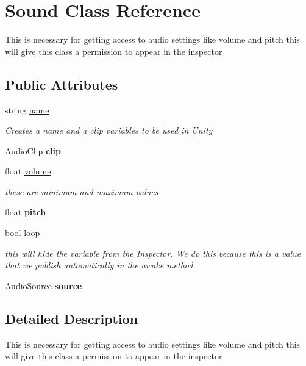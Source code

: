 \hypertarget{class_sound}{}\section{Sound Class Reference}
\label{class_sound}


This is necessary for getting access to audio settings like volume and pitch this will give this class a permission to appear in the inspector  


\subsection*{Public Attributes}
\begin{DoxyCompactItemize}
\item 
string \mbox{\hyperlink{class_sound_a6232daa7d1f983315cc0d10cf776ab76}{name}}
\begin{DoxyCompactList}\small\item\em Creates a name and a clip variables to be used in Unity \end{DoxyCompactList}\item 
\mbox{\label{class_sound_ab7878c271c13d5e8fbdf25714e363b77}} 
Audio\+Clip {\bfseries clip}
\item 
float \mbox{\hyperlink{class_sound_a7ab1335f27bd340c389568889823cc00}{volume}}
\begin{DoxyCompactList}\small\item\em these are minimum and maximum values \end{DoxyCompactList}\item 
\mbox{\label{class_sound_aef4ee55185bf12b9b2b2ca037a8c621a}} 
float {\bfseries pitch}
\item 
bool \mbox{\hyperlink{class_sound_a24f0da6a226712e28b3159aa9ebb4be5}{loop}}
\begin{DoxyCompactList}\small\item\em this will hide the variable from the Inspector. We do this because this is a value that we publish automatically in the awake method \end{DoxyCompactList}\item 
\mbox{\label{class_sound_ac6ec734812a52abf31595cab2ba48d8d}} 
Audio\+Source {\bfseries source}
\end{DoxyCompactItemize}


\subsection{Detailed Description}
This is necessary for getting access to audio settings like volume and pitch this will give this class a permission to appear in the inspector 



